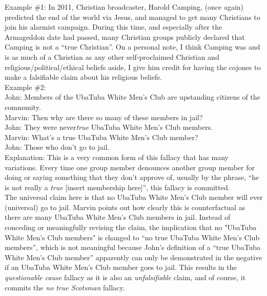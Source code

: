 \documentclass[a4paper,12pt,single,pdftex]{scrartcl}
\begin{document}
    
      Example \#1: In 2011, Christian broadcaster, Harold Camping, (once again) predicted the end of the world via Jesus, and managed to get many Christians to join his alarmist campaign.  During this time, and especially after the Armageddon date had passed,  many Christian groups publicly declared that Camping is not a “true Christian”.  On a personal note, I think Camping was and is as much of a Christian as any other self-proclaimed Christian and religious/political/ethical beliefs aside, I give him credit for having the cojones to make a falsifiable claim about his religious beliefs.
    \\

    
      Example \#2:
    \\

    
      John: Members of the UbaTuba White Men's Club are upstanding citizens of the community.
    \\

    
      Marvin: Then why are there so many of these members in jail?
    \\

    
      John: They were never{\it  true} UbaTuba White Men's Club members.
    \\

    
      Marvin: What’s a true UbaTuba White Men's Club member?
    \\

    
      John: Those who don't go to jail.
    \\

    
      Explanation: This is a very common form of this fallacy that has many variations.  Every time one group member denounces another group member for doing or saying something that they don’t approve of, usually by the phrase, “he is not really a {\it true} [insert membership here]”, this fallacy is committed.
    \\

    
      The universal claim here is that no UbaTuba White Men's Club member will ever (universal) go to jail.  Marvin points out how clearly this is counterfactual as there are many UbaTuba White Men's Club members in jail.  Instead of conceding or meaningfully revising the claim, the implication that no "UbaTuba White Men's Club members" is changed to “no true UbaTuba White Men's Club members”, which is not meaningful because John’s definition of a “true UbaTuba White Men's Club member” apparently can only be demonstrated in the negative if an UbaTuba White Men's Club member goes to jail.  This results in the {\it questionable cause} fallacy as it is also an {\it unfalsifiable} claim, and of course, it commits the {\it no true Scotsman} fallacy.
    \\
\end{document}
